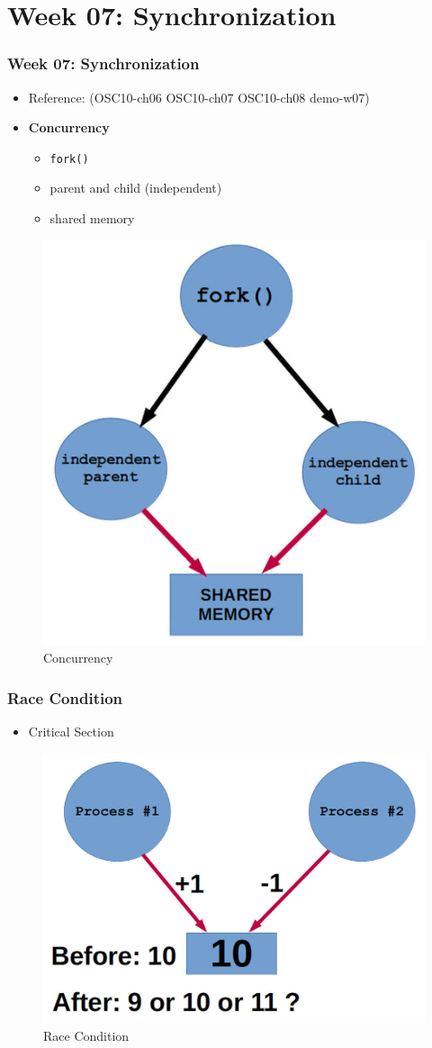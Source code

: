 \documentclass[xcolor=table, notheorems, hyperref={pdfpagelabels=false}]{beamer}
\begin{document}
\section{Week 07: Synchronization}
\begin{frame}[fragile]
\frametitle{Week 07: Synchronization}

\begin{itemize}
\item Reference: (OSC10-ch06 OSC10-ch07 OSC10-ch08 demo-w07)
\item \textbf{Concurrency}
\begin{itemize}
\item \texttt{fork()}
\item parent and child (independent)
\item shared memory
\end{itemize}
\end{itemize}

\begin{figure}
\includegraphics[width=0.40\linewidth]{os-concurrecy}
\caption{Concurrency}
\end{figure}

\end{frame}


\begin{frame}[fragile]
\frametitle{Race Condition}

\begin{itemize}
\item Critical Section
\end{itemize}

\begin{figure}
\includegraphics[width=0.70\linewidth]{os-critical}
\caption{Race Condition}
\end{figure}

\end{frame}
\end{document}

